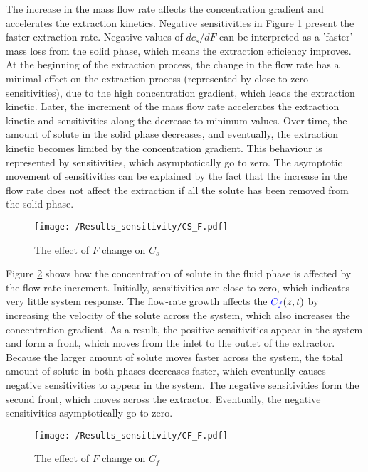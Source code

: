 \documentclass[../Article_Model_Parameters.tex]{subfiles}
\begin{document}
    The increase in the mass flow rate affects the concentration gradient and accelerates the extraction kinetics. Negative sensitivities in Figure \ref{fig:Sensitivty_F_CS} present the faster extraction rate. Negative values of $dc_s/dF$ can be interpreted as a 'faster' mass loss from the solid phase, which means the extraction efficiency improves. At the beginning of the extraction process, the change in the flow rate has a minimal effect on the extraction process (represented by close to zero sensitivities), due to the high concentration gradient, which leads the extraction kinetic. Later, the increment of the mass flow rate accelerates the extraction kinetic and sensitivities along the decrease to minimum values. Over time, the amount of solute in the solid phase decreases, and eventually, the extraction kinetic becomes limited by the concentration gradient. This behaviour is represented by sensitivities, which asymptotically go to zero. The asymptotic movement of sensitivities can be explained by the fact that the increase in the flow rate does not affect the extraction if all the solute has been removed from the solid phase.
    
    \begin{figure}[h!]
    	\centering
    	\texttt{[image: /Results\_sensitivity/CS\_F.pdf]}
    	\caption{The effect of $F$ change on $C_s$}
    	\label{fig:Sensitivty_F_CS}
    \end{figure}
    
    Figure \ref{fig:Sensitivty_F_CF} shows how the concentration of solute in the fluid phase is affected by the flow-rate increment. Initially, sensitivities are close to zero, which indicates very little system response. The flow-rate growth affects the ${\color{blue}C_f}(z,t)$ by increasing the velocity of the solute across the system, which also increases the concentration gradient. As a result, the positive sensitivities appear in the system and form a front, which moves from the inlet to the outlet of the extractor. Because the larger amount of solute moves faster across the system, the total amount of solute in both phases decreases faster, which eventually causes negative sensitivities to appear in the system. The negative sensitivities form the second front, which moves across the extractor. Eventually, the negative sensitivities asymptotically go to zero.
    
    \begin{figure}[h!]
    	\centering
    	\texttt{[image: /Results\_sensitivity/CF\_F.pdf]}
    	\caption{The effect of $F$ change on $C_f$}
    	\label{fig:Sensitivty_F_CF}
    \end{figure}
\end{document}
